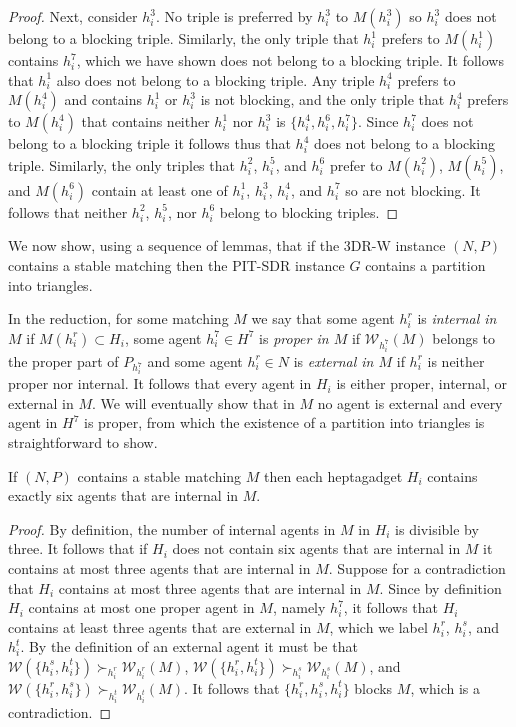 \begin{proof}
Next, consider $h_i^3$. No triple is preferred by $h_i^3$ to $M(h_i^3)$ so $h_i^3$ does not belong to a blocking triple. 
Similarly, the only triple that $h_i^1$ prefers to $M(h_i^1)$ contains $h_i^7$, which we have shown does not belong to a blocking triple. It follows that $h_i^1$ also does not belong to a blocking triple. 
Any triple $h_i^4$ prefers to $M(h_i^4)$ and contains $h_i^1$ or $h_i^3$ is not blocking, and the only triple that $h_i^4$ prefers to $M(h_i^4)$ that contains neither $h_i^1$ nor $h_i^3$ is $\{ h_i^4, h_i^6, h_i^7 \}$. Since $h_i^7$ does not belong to a blocking triple it follows thus that $h_i^4$ does not belong to a blocking triple. 
Similarly, the only triples that $h_i^2$, $h_i^5$, and $h_i^6$ prefer to $M(h_i^2)$, $M(h_i^5)$, and $M(h_i^6)$ contain at least one of $h_i^1$, $h_i^3$, $h_i^4$, and $h_i^7$ so are not blocking. It follows that neither $h_i^2$, $h_i^5$, nor $h_i^6$ belong to blocking triples.
\end{proof}

We now show, using a sequence of lemmas, that if the 3DR-W instance $(N, P)$ contains a stable matching then the PIT-SDR instance $G$ contains a partition into triangles.

In the reduction, for some matching $M$ we say that some agent $h_i^r$ is \emph{internal in $M$} if $M(h_i^r) \subset H_i$, some agent $h_i^7 \in H^7$ is \emph{proper in $M$} if $\mathscr{W}_{h_i^7}(M)$ belongs to the proper part of $P_{h_i^7}$ and some agent $h_i^r \in N$ is \emph{external in $M$} if $h_i^r$ is neither proper nor internal. It follows that every agent in $H_i$ is either proper, internal, or external in $M$. We will eventually show that in $M$ no agent is external and every agent in $H^7$ is proper, from which the existence of a partition into triangles is straightforward to show.

\begin{lem}
\label{lem:threed_sr_w_exactlysixinternal}
If $(N, P)$ contains a stable matching $M$ then each heptagadget $H_i$ contains exactly six agents that are internal in $M$.
\end{lem}
\begin{proof}
By definition, the number of internal agents in $M$ in $H_i$ is divisible by three. It follows that if $H_i$ does not contain six agents that are internal in $M$ it contains at most three agents that are internal in $M$. Suppose for a contradiction that $H_i$ contains at most three agents that are internal in $M$. Since by definition $H_i$ contains at most one proper agent in $M$, namely $h_i^7$, it follows that $H_i$ contains at least three agents that are external in $M$, which we label $h_i^r$, $h_i^s$, and $h_i^t$. By the definition of an external agent it must be that $\mathscr{W}(\{ h_i^s, h_i^t \}) \succ_{h_i^r} \mathscr{W}_{h_i^r}(M)$, $\mathscr{W}(\{ h_i^r, h_i^t \}) \succ_{h_i^s} \mathscr{W}_{h_i^s}(M)$, and $\mathscr{W}(\{ h_i^r, h_i^s \}) \succ_{h_i^t} \mathscr{W}_{h_i^t}(M)$. It follows that $\{ h_i^r, h_i^s, h_i^t \}$ blocks $M$, which is a contradiction.
\end{proof}

